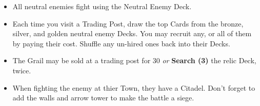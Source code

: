 \begin{multicols}{2}
\columnbreak

\begin{itemize}
\item All neutral enemies fight using the Neutral Enemy Deck.
\item Each time you visit a Trading Post, draw the top Cards from the  bronze,  silver, and  golden neutral enemy Decks.
You may recruit any, or all of them by paying their cost.
Shuffle any un-hired ones back into their Decks.

\item The Grail may be sold at a trading post for 30  \textit{or} \textbf{Search (3)} the relic Deck, twice.

\item When fighting the enemy at thier Town, they have a Citadel.
Don't forget to add the walls and arrow tower to make the battle a siege.
\end{itemize}

\end{multicols}


\newpage

